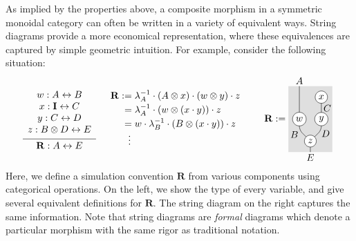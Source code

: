 \documentclass[acmsmall,screen,review,anonymous]{acmart}
\begin{document}
As implied by the properties above,
a composite morphism in a symmetric monoidal category
can often be written in a variety of equivalent ways.
String diagrams provide a more economical representation,
where these equivalences are captured
by simple geometric intuition.
For example, consider the following situation:
\[
  \begin{prooftree}
    \hypo{
      \begin{array}{c}
	w : A \leftrightarrow B \\
	x : \mathbf{I} \leftrightarrow C \\
	y : C \leftrightarrow D \\
	z : B \otimes D \leftrightarrow E
      \end{array}
    }
    \infer1{\mathbf{R} : A \leftrightarrow E}
  \end{prooftree}
  \quad
  \begin{array}{r@{}l}
    \mathbf{R} := {} &
    \lambda_A^{-1} \cdot
    (A \otimes x) \cdot
    (w \otimes y) \cdot
    z 
    \\[0.5ex]
    = {} &
    \lambda_A^{-1} \cdot
    (w \otimes (x \cdot y)) \cdot z
    \\[0.5ex]
    = {} &
    w \cdot \lambda_B^{-1} \cdot
    (B \otimes (x \cdot y)) \cdot z
    \\
    \vdots \:\, &
  \end{array}
  \qquad
  \mathbf{R} :=
  \vcenter{\hbox{%
    \begin{tikzpicture}[scale=0.4,inner sep=2pt,baseline=(w.base)]
      \fill[scsdbg] (-1, 0) rectangle (3, 6);
      \draw[rounded corners]
            (0, 6) node[above] {$A$}
         -- (0, 3) node[draw,fill=white,circle] (w) {$w$}
         -- (0, 2) node[below left,inner sep=1pt] {$B$} -- (1, 1)
         -- (1, 0) node[below] {$E$};
      \draw[rounded corners]
            (2, 5) node[draw,fill=white,circle] {$x$}
         -- node[midway,right] {$C$} (2, 3) node[draw,fill=white,circle] {$y$}
         -- (2, 2) node[below right,inner sep=0pt] {$D$} -- (1, 1) node[draw,fill=white,circle] {$z$};
    \end{tikzpicture}
  }}
\]
Here,
we define a simulation convention $\mathbf{R}$ from various components
using categorical operations.
On the left,
we show the type of every variable,
and give several equivalent definitions for $\mathbf{R}$.
The string diagram on the right
captures the same information.
Note that
string diagrams
are \emph{formal} diagrams
which denote a particular morphism
with the same rigor
as traditional notation.
\end{document}

